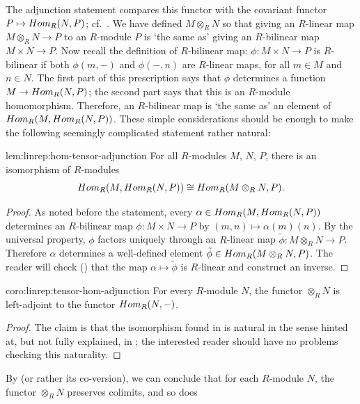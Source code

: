 The adjunction statement compares this functor with the covariant
functor $P \mapsto Hom_R(N, P)$; cf.\
. We have defined
$M \otimes_R N$ so that giving an $R$-linear map $M \otimes_R N \to P$
to an $R$-module $P$ is `the same as' giving an $R$-bilinear map
$M \times N \to P$. Now recall the definition of $R$-bilinear map:
$\phi : M \times N \to P$ is $R$-bilinear if both
$\phi(m, \mathord{-})$ and $\phi(\mathord{-}, n)$ are $R$-linear maps,
for all $m \in M$ and $n \in N$. The first part of this prescription
says that $\phi$ determines a function $M \to Hom_R(N, P)$; the
second part says that this is an $R$-module homomorphism. Therefore,
an $R$-bilinear map is `the same as' an element of
$Hom_R(M, Hom_R(N, P))$. These simple considerations should be
enough to make the following seemingly complicated statement rather
natural:
\begin{lem}{}{lem:linrep:hom-tensor-adjunction}
  For all $R$-modules $M$, $N$, $P$, there is an isomorphism of
  $R$-modules
  \[
    Hom_R(M, Hom_R(N, P)) \cong Hom_R(M \otimes_R N, P).
  \]
\end{lem}
\begin{proof}
  As noted before the statement, every
  $\alpha \in Hom_R(M, Hom_R(N, P))$ determines an $R$-bilinear map
  $\phi : M \times N \to P$ by $(m, n) \mapsto \alpha(m)(n)$. By the
  universal property, $\phi$ factors uniquely through an $R$-linear
  map $\tilde\phi : M \otimes_R N \to P$. Therefore $\alpha$
  determines a well-defined element
  $\tilde\phi \in Hom_R(M \otimes_R N, P)$.  The reader will check
  (\Cref{exer:linrep:complete-proof-of-adjunction}) that the map
  $\alpha \mapsto \tilde\phi$ is $R$-linear and construct an inverse.
\end{proof}
\begin{coro}{}{coro:linrep:tensor-hom-adjunction}
  For every $R$-module $N$, the functor $\otimes_R N$ is left-adjoint
  to the functor $Hom_R(N, \mathord{-})$.
\end{coro}
\begin{proof}
  The claim is that the isomorphism found in  is
  natural in the sense hinted at, but not fully explained, in
  ; the interested reader
  should have no problems checking this naturality.
\end{proof}
By  (or rather its
co-version), we can conclude that for each $R$-module $N$, the functor
$\otimes_R N$ preserves colimits, and so does
